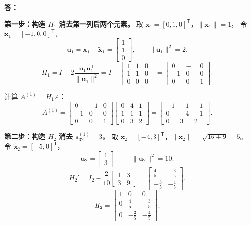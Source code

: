 \documentclass{article}
\begin{document}
\noindent \textbf{答：}

\textbf{第一步：构造 $H_1$ 消去第一列后两个元素。}
取 $\bm{x}_1=[0,1,0]^{\mathsf T}$，$\|\bm{x}_1\|=1$。
令 $\widetilde{\bm{x}}_1=[-1,0,0]^{\mathsf T}$，
\[
\bm{u}_1 = \bm{x}_1 - \widetilde{\bm{x}}_1 = \begin{bmatrix}1\\1\\0\end{bmatrix},\qquad
\|\bm{u}_1\|^2 = 2.
\]
\[
H_1 = I - 2\frac{\bm{u}_1\bm{u}_1^{\mathsf T}}{\|\bm{u}_1\|^2}
= I - \begin{bmatrix}1 & 1 & 0\\1 & 1 & 0\\0 & 0 & 0\end{bmatrix}
= \begin{bmatrix}
0 & -1 & 0\\
-1 & 0 & 0\\
0 & 0 & 1
\end{bmatrix}.
\]

计算 $A^{(1)} = H_1 A$：
\[
A^{(1)} = \begin{bmatrix}
0 & -1 & 0\\
-1 & 0 & 0\\
0 & 0 & 1
\end{bmatrix}
\begin{bmatrix}
0 & 4 & 1\\
1 & 1 & 1\\
0 & 3 & 2
\end{bmatrix}
= \begin{bmatrix}
-1 & -1 & -1\\
0 & -4 & -1\\
0 & 3 & 2
\end{bmatrix}.
\]

\textbf{第二步：构造 $H_2$ 消去 $a_{32}^{(1)}=3$。}
取 $\bm{x}_2=[-4,3]^{\mathsf T}$，$\|\bm{x}_2\|=\sqrt{16+9}=5$。
令 $\widetilde{\bm{x}}_2=[-5,0]^{\mathsf T}$，
\[
\bm{u}_2 = \begin{bmatrix}1\\3\end{bmatrix},\qquad
\|\bm{u}_2\|^2 = 10.
\]
\[
H_2' = I_2 - \frac{2}{10}\begin{bmatrix}1 & 3\\3 & 9\end{bmatrix}
= \begin{bmatrix}\frac45 & -\frac35\\[4pt]-\frac35 & -\frac45\end{bmatrix}.
\]
\[
H_2 = \begin{bmatrix}
1 & 0 & 0\\
0 & \frac45 & -\frac35\\[4pt]
0 & -\frac35 & -\frac45
\end{bmatrix}.
\]
\end{document}

